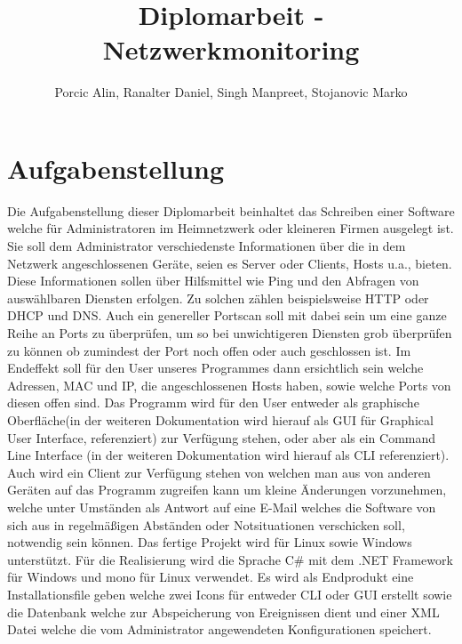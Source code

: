 \documentclass[10pt,a4paper]{report}
\title{Diplomarbeit - Netzwerkmonitoring}
\author{Porcic Alin, Ranalter Daniel, Singh Manpreet, Stojanovic Marko}
\begin{document}
\maketitle
\chapter{Aufgabenstellung}
Die Aufgabenstellung dieser Diplomarbeit beinhaltet das Schreiben einer Software welche für Administratoren im Heimnetzwerk oder kleineren Firmen ausgelegt ist. Sie soll dem Administrator verschiedenste Informationen über die in dem Netzwerk angeschlossenen Geräte, seien es Server oder Clients, Hosts u.a., bieten. Diese Informationen sollen über Hilfsmittel wie Ping und den Abfragen von auswählbaren Diensten erfolgen. Zu solchen zählen beispielsweise HTTP oder DHCP und DNS. Auch ein genereller Portscan soll mit dabei sein um eine ganze Reihe an Ports zu überprüfen, um so bei unwichtigeren Diensten grob überprüfen zu können ob zumindest der Port noch offen oder auch geschlossen ist. Im Endeffekt soll für den User unseres Programmes dann ersichtlich sein welche Adressen, MAC und IP, die angeschlossenen Hosts haben, sowie welche Ports von diesen offen sind. Das Programm wird für den User entweder als graphische Oberfläche(in der weiteren Dokumentation wird hierauf als GUI für Graphical User Interface, referenziert) zur Verfügung stehen, oder aber als ein Command Line Interface (in der weiteren Dokumentation wird hierauf als CLI referenziert). Auch wird ein Client zur Verfügung stehen von welchen man aus von anderen Geräten auf das Programm zugreifen kann um kleine Änderungen vorzunehmen, welche unter Umständen als Antwort auf eine E-Mail welches die Software von sich aus in regelmäßigen Abständen oder Notsituationen verschicken soll, notwendig sein können. Das fertige Projekt wird für Linux sowie Windows unterstützt. Für die Realisierung wird die Sprache C\# mit dem .NET Framework für Windows und mono für Linux verwendet. Es wird als Endprodukt eine Installationsfile geben welche zwei Icons für entweder CLI oder GUI erstellt sowie die Datenbank welche zur Abspeicherung von Ereignissen dient und einer XML Datei welche die vom Administrator angewendeten Konfigurationen speichert. 
\end{document}
